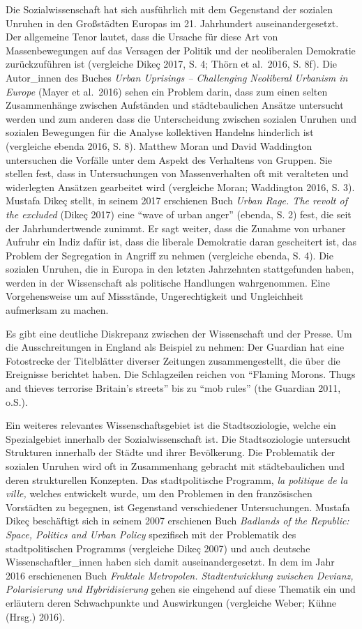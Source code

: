 \documentclass[a4paper,
fontsize=11pt,
oneside,
numbers=noperiodatend,
parskip=half-,
bibliography=totoc,
final
]{scrartcl}
\begin{document}
Die Sozialwissenschaft hat sich ausführlich mit dem Gegenstand der
sozialen Unruhen in den Großstädten Europas im 21. Jahrhundert
auseinandergesetzt. Der allgemeine Tenor lautet, dass die Ursache für
diese Art von Massenbewegungen auf das Versagen der Politik und der
neoliberalen Demokratie zurückzuführen ist (vergleiche Dikeç 2017, S. 4;
Thörn et al.~2016, S. 8f). Die Autor\_innen des Buches \emph{Urban
Uprisings -- Challenging Neoliberal Urbanism in Europe} (Mayer et
al.~2016) sehen ein Problem darin, dass zum einen selten Zusammenhänge
zwischen Aufständen und städtebaulichen Ansätze untersucht werden und
zum anderen dass die Unterscheidung zwischen sozialen Unruhen und
sozialen Bewegungen für die Analyse kollektiven Handelns hinderlich ist
(vergleiche ebenda 2016, S. 8). Matthew Moran und David Waddington
untersuchen die Vorfälle unter dem Aspekt des Verhaltens von Gruppen.
Sie stellen fest, dass in Untersuchungen von Massenverhalten oft mit
veralteten und widerlegten Ansätzen gearbeitet wird (vergleiche Moran;
Waddington 2016, S. 3). Mustafa Dikeç stellt, in seinem 2017 erschienen
Buch \emph{Urban Rage. The revolt of the excluded} (Dikeç 2017) eine
\enquote{wave of urban anger} (ebenda, S. 2) fest, die seit der
Jahrhundertwende zunimmt. Er sagt weiter, dass die Zunahme von urbaner
Aufruhr ein Indiz dafür ist, dass die liberale Demokratie daran
gescheitert ist, das Problem der Segregation in Angriff zu nehmen
(vergleiche ebenda, S. 4). Die sozialen Unruhen, die in Europa in den
letzten Jahrzehnten stattgefunden haben, werden in der Wissenschaft als
politische Handlungen wahrgenommen. Eine Vorgehensweise um auf
Missstände, Ungerechtigkeit und Ungleichheit aufmerksam zu machen.

Es gibt eine deutliche Diskrepanz zwischen der Wissenschaft und der
Presse. Um die Ausschreitungen in England als Beispiel zu nehmen: Der
Guardian hat eine Fotostrecke der Titelblätter diverser Zeitungen
zusammengestellt, die über die Ereignisse berichtet haben. Die
Schlagzeilen reichen von \enquote{Flaming Morons. Thugs and thieves
terrorise Britain's streets} bis zu \enquote{mob rules} (the Guardian
2011, o.S.).

Ein weiteres relevantes Wissenschaftsgebiet ist die Stadtsoziologie,
welche ein Spezialgebiet innerhalb der Sozialwissenschaft ist. Die
Stadtsoziologie untersucht Strukturen innerhalb der Städte und ihrer
Bevölkerung. Die Problematik der sozialen Unruhen wird oft in
Zusammenhang gebracht mit städtebaulichen und deren strukturellen
Konzepten. Das stadtpolitische Programm, \emph{la politique de la
ville,} welches entwickelt wurde, um den Problemen in den französischen
Vorstädten zu begegnen, ist Gegenstand verschiedener Untersuchungen.
Mustafa Dikeç beschäftigt sich in seinem 2007 erschienen Buch
\emph{Badlands of the Republic: Space, Politics and Urban Policy}
spezifisch mit der Problematik des stadtpolitischen Programms
(vergleiche Dikeç 2007) und auch deutsche Wissenschaftler\_innen haben
sich damit auseinandergesetzt. In dem im Jahr 2016 erschienenen Buch
\emph{Fraktale Metropolen. Stadtentwicklung zwischen Devianz,
Polarisierung und Hybridisierung} gehen sie eingehend auf diese Thematik
ein und erläutern deren Schwachpunkte und Auswirkungen (vergleiche
Weber; Kühne (Hrsg.) 2016).
\end{document}
